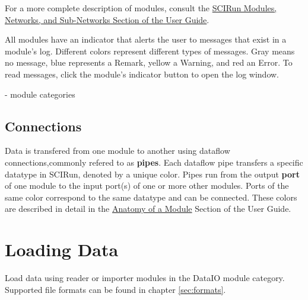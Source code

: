 \documentclass[fleqn,12pt,openany]{book}
\begin{document}
For a more complete description of modules, consult the \href{http://software.sci.utah.edu/SCIRunDocs/index.php/CIBC:Documentation:SCIRun:UserGuide:Concepts#SCIRun_Modules.2C_Networks.2C_and_Sub-Networks}{SCIRun Modules, Networks, and Sub-Networks Section of the User Guide}.

All modules have an indicator that alerts the user to messages that exist in a module's log. Different colors represent different types of messages.
Gray means no message, blue represents a Remark, yellow a Warning, and red an Error.
To read messages, click the module's indicator button to open the log window.

- module categories


\subsection{Connections}\label{connections}

Data is transfered from one module to another using dataflow connections,commonly refered to as \textbf{pipes}.
Each dataflow pipe transfers a specific datatype in SCIRun, denoted by a unique color.
Pipes run from the output \textbf{port} of one module to the input port(s) of one or more other modules.
Ports of the same color correspond to the same datatype and can be connected.
These colors are described in detail in the \href{http://software.sci.utah.edu/SCIRunDocs/index.php/CIBC:Documentation:SCIRun:UserGuide:Networks#Anatomy_of_a_Module}{Anatomy of a Module} Section of the User Guide.


\section{Loading Data}

Load data using reader or importer modules in the DataIO module category.
Supported file formats can be found in chapter \ref{sec:formats}.

\end{document}
